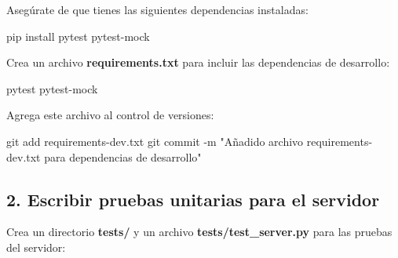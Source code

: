 \documentclass[
  a4paper,
  DIV=11,
  numbers=noendperiod,
  onepage,
  openany]{scrreprt}
\newenvironment{Shaded}{\begin{snugshade}}{\end{snugshade}}
\newcommand{\AttributeTok}[1]{\textcolor[rgb]{0.40,0.45,0.13}{#1}}
\newcommand{\ExtensionTok}[1]{\textcolor[rgb]{0.00,0.23,0.31}{#1}}
\newcommand{\FunctionTok}[1]{\textcolor[rgb]{0.28,0.35,0.67}{#1}}
\newcommand{\NormalTok}[1]{\textcolor[rgb]{0.00,0.23,0.31}{#1}}
\newcommand{\StringTok}[1]{\textcolor[rgb]{0.13,0.47,0.30}{#1}}
\begin{document}
Asegúrate de que tienes las siguientes dependencias instaladas:

\begin{Shaded}
\begin{Highlighting}[]
\ExtensionTok{pip}\NormalTok{ install pytest pytest{-}mock}
\end{Highlighting}
\end{Shaded}

Crea un archivo \textbf{requirements.txt} para incluir las dependencias
de desarrollo:

\begin{Shaded}
\begin{Highlighting}[]
\NormalTok{pytest}
\NormalTok{pytest{-}mock}
\end{Highlighting}
\end{Shaded}

Agrega este archivo al control de versiones:

\begin{Shaded}
\begin{Highlighting}[]
\FunctionTok{git}\NormalTok{ add requirements{-}dev.txt}
\FunctionTok{git}\NormalTok{ commit }\AttributeTok{{-}m} \StringTok{"Añadido archivo requirements{-}dev.txt para dependencias de desarrollo"}
\end{Highlighting}
\end{Shaded}

\subsection{2. Escribir pruebas unitarias para el
servidor}\label{escribir-pruebas-unitarias-para-el-servidor}

Crea un directorio \textbf{tests/} y un archivo
\textbf{tests/test\_server.py} para las pruebas del servidor:
\end{document}
